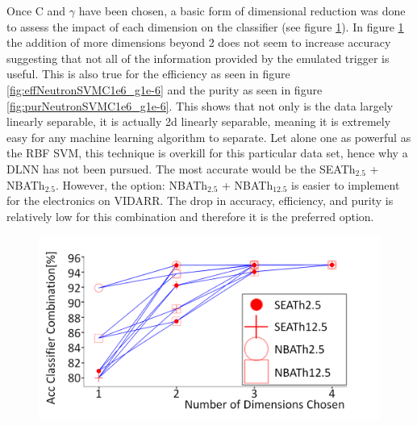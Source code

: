 Once C and $\gamma$ have been chosen, a basic form of dimensional reduction was done to assess the impact of each dimension on the classifier (see figure \ref{fig:accNeutronSVMC1e6_g1e-6}). In figure \ref{fig:accNeutronSVMC1e6_g1e-6} the addition of more dimensions beyond 2 does not seem to increase accuracy suggesting that not all of the information provided by the emulated trigger is useful. This is also true for the efficiency as seen in figure \ref{fig:effNeutronSVMC1e6_g1e-6} and the purity as seen in figure \ref{fig:purNeutronSVMC1e6_g1e-6}. This shows that not only is the data largely linearly separable, it is actually 2d linearly separable, meaning it is extremely easy for any machine learning algorithm to separate. Let alone one as powerful as the RBF SVM, this technique is overkill for this particular data set, hence why a DLNN has not been pursued. The most accurate would be the SEATh$_{2.5}$ + NBATh$_{2.5}$. However, the option: NBATh$_{2.5}$ + NBATh$_{12.5}$ is easier to implement for the electronics on VIDARR. The drop in accuracy, efficiency, and purity is relatively low for this combination and therefore it is the preferred option. 

\begin{figure}[!h]
\centering
\includegraphics[width=0.8\linewidth]{Chapter4/Figs/Raster/accNeutronSVMC1e6_g1e-6MedText.png}
\label{fig:accNeutronSVMC1e6_g1e-6}
\end{figure}

